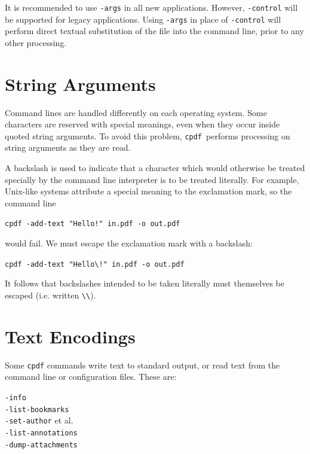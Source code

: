 \documentclass{book}
\newcommand{\cpdf}{\texttt{cpdf}}
\begin{document}
It is recommended to use \texttt{-args} in all new applications. However, \texttt{-control} will be supported for legacy applications. Using \texttt{-args} in place of \texttt{-control} will perform direct textual substitution of the file into the command line, prior to any other processing.


\section{String Arguments}
Command lines are handled differently on each operating system. Some
characters are reserved with special meanings, even when they occur inside
quoted string arguments. To avoid this problem, \cpdf\ performs processing on
string arguments as they are read.

A backslash is used to indicate that a character which would otherwise be
treated specially by the command line interpreter is to be treated literally. For
example, Unix-like systems attribute a special meaning to the exclamation mark, so
the command line
\begin{framed}
 \noindent\small\verb?cpdf -add-text "Hello!" in.pdf -o out.pdf?
\end{framed}
\noindent would fail. We must escape the exclamation mark with a backslash:
\begin{framed}
 \noindent\small\verb?cpdf -add-text "Hello\!" in.pdf -o out.pdf?
\end{framed}
\noindent It follows that backslashes intended to be taken literally must themselves be
escaped (i.e. written \verb!\\!).

\section{Text Encodings}
\label{textencodings}

Some \texttt{cpdf} commands write text to standard output, or read text from
the command line or configuration files. These are:

\begin{framed}
  \noindent\small\verb!-info!\\
  \noindent\small\verb!-list-bookmarks!\\
  \noindent\small\verb!-set-author! et al.\\
  \noindent\small\verb!-list-annotations!\\
  \noindent\small\verb!-dump-attachments!
\end{framed}
\end{document}
